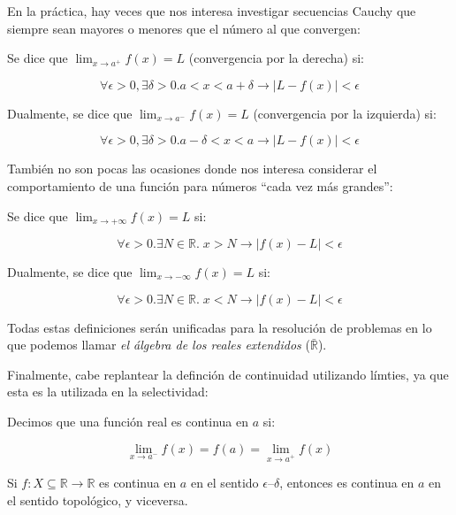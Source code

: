 \documentclass[10pt]{article}
\newcommand{\R}{\mathbb{R}}
\begin{document}
En la práctica, hay veces que nos interesa investigar secuencias Cauchy que siempre sean mayores o menores que el número al que convergen:

\begin{definition}
  Se dice que $ \lim_{x \to a^+} f(x) = L $ (convergencia por la derecha) si:

  \[ \forall \epsilon > 0, \exists \delta > 0. a < x < a +\delta \to | L - f(x) | < \epsilon \]

  Dualmente, se dice que $ \lim_{x \to a^-} f(x) = L $ (convergencia por la izquierda) si:

  \[ \forall \epsilon > 0, \exists \delta > 0. a - \delta < x < a \to | L - f(x) | < \epsilon \]
\end{definition}

También no son pocas las ocasiones donde nos interesa considerar el comportamiento de una función para números ``cada vez más grandes'':

\begin{definition}
  Se dice que $ \lim_{x \to +\infty} f(x) = L $ si:

  \[ \forall \epsilon > 0. \exists N \in \R.\; x > N \to | f(x) - L | < \epsilon \]

  Dualmente, se dice que $ \lim_{x \to -\infty} f(x) = L $ si:

  \[ \forall \epsilon > 0. \exists N \in \R.\; x < N \to | f(x) - L | < \epsilon \]
\end{definition}

Todas estas definiciones serán unificadas para la resolución de problemas en lo que podemos llamar \textit{el álgebra de los reales extendidos} ($ \bar{\R} $).

Finalmente, cabe replantear la definción de continuidad utilizando límties, ya que esta es la utilizada en la selectividad:

\begin{definition}[Continuidad]
  Decimos que una función real es continua en $ a $ si:

  \[ \lim_{x \to a^-} f(x) = f(a) = \lim_{x \to a^+} f(x) \]
\end{definition}

\begin{theorem}
  Si $f : X \subseteq \R \to \R$ es continua en $a$ en el sentido $\epsilon$--$\delta$, entonces es continua en $a$ en el sentido topológico, y viceversa.
\end{theorem}
\end{document}
